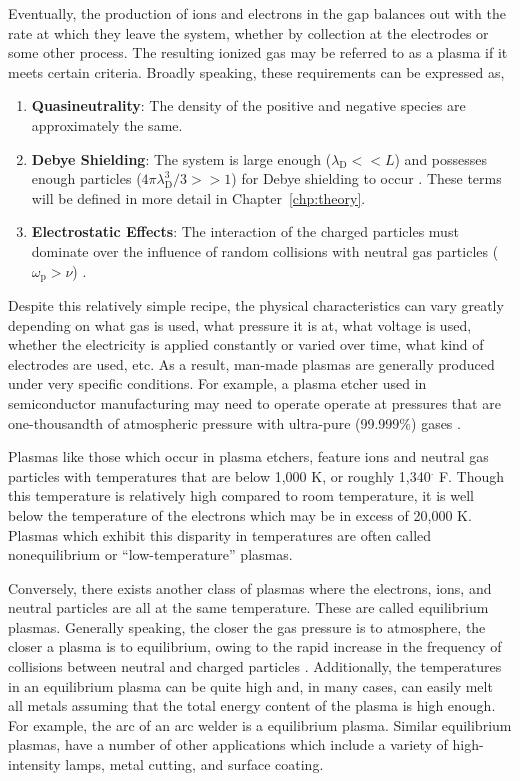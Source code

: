 Eventually, the production of ions and electrons in the gap balances out with
the rate at which they leave the system, whether by collection at the electrodes
or some other process. The resulting ionized gas may be referred to as a plasma
if it meets certain criteria. Broadly speaking, these requirements can be
expressed as,
\begin{enumerate}
  \item \textbf{Quasineutrality}: The density of the positive and negative
species are approximately the same.
  \item \textbf{Debye Shielding}: The system is large enough ($\lambda_\mathrm{D} 
<< L$) and possesses enough particles ($4\pi\lambda_\mathrm{D}^3/3 >> 1$) for
Debye shielding to occur \cite{Chen1984}. These terms will be defined in more
detail in Chapter~\ref{chp:theory}.
  \item \textbf{Electrostatic Effects}: The interaction of the charged particles
must dominate over the influence of random collisions with neutral gas particles
($\omega_\mathrm{p} > \nu$) \cite{Chen1984}.
\end{enumerate}

Despite this relatively simple recipe, the physical characteristics can vary
greatly depending on what gas is used, what pressure it is at, what voltage is
used, whether the electricity is applied constantly or varied over time, what
kind of electrodes are used, etc. As a result, man-made plasmas are generally
produced under very specific conditions. For example, a plasma etcher used in
semiconductor manufacturing may need to operate operate at pressures that are
one-thousandth of atmospheric pressure with ultra-pure (99.999\%) gases
\cite{Greenberg1993a}.

Plasmas like those which occur in plasma etchers, feature ions and neutral gas
particles with temperatures that are below 1,000 K, or roughly 1,340$^\cdot$ F.
Though this temperature is relatively high compared to room temperature, it is
well below the temperature of the electrons which may be in excess of 20,000 K.
Plasmas which exhibit this disparity in temperatures are often called
nonequilibrium or ``low-temperature'' plasmas.

Conversely, there exists another class of plasmas where the electrons, ions, and
neutral particles are all at the same temperature. These are called equilibrium
plasmas. Generally speaking, the closer the gas pressure is to atmosphere, the
closer a plasma is to equilibrium, owing to the rapid increase in the frequency
of collisions between neutral and charged particles \cite{Kunhardt2000}.
Additionally, the temperatures in an equilibrium plasma can be quite high and,
in many cases, can easily melt all metals assuming that the total energy content
of the plasma is high enough. For example, the arc of an arc welder is a
equilibrium plasma. Similar equilibrium plasmas, have a number of other
applications which include a variety of high-intensity lamps, metal cutting, and
surface coating.

